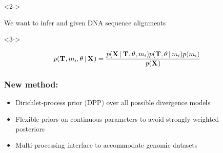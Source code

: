 \begin{frame}[t]
    \vspace{3.5mm}

    \begin{minipage}[c][0.35\textheight][c]{\linewidth}
        \begin{uncoverenv}<2->
            \begin{center}
            We want to infer \textcolor{blue}{\divModel{}} and
            \textcolor{blue}{\divTimeMapVector} given DNA sequence
            alignments
            \textcolor{blue}{\alignmentVector}
        \end{center}
        \end{uncoverenv}

        \vspace{4mm}

        \begin{uncoverenv}<3->
            \begin{displaybox}[0.85\linewidth]
                \begin{minipage}[c][0.12\textheight][c]{\linewidth}

                \[
                    p(\divTimeMapVector,
                      \divModel{i},
                      \allParameters{}
                      \given \alignmentVector)
                      =
                    \frac{
                        p(\alignmentVector \given
                          \divTimeMapVector,
                          \allParameters{},
                          \divModel{i})
                        p(\divTimeMapVector,
                          \allParameters{}
                          \given \divModel{i})
                        p(\divModel{i})
                        }{p(\alignmentVector)}
                \]
                \vspace{-1mm}
                \end{minipage}
            \end{displaybox}
        \end{uncoverenv}
    \end{minipage}
\end{frame}

\begin{frame}
    \frametitle{New method: \dppmsbayes}
    \begin{itemize}
        \item<1-> Dirichlet-process prior (DPP) over all possible divergence
            models
        \item<2-> Flexible priors on continuous parameters to avoid strongly
            weighted posteriors
        \item<3-> Multi-processing interface to accommodate genomic datasets
    \end{itemize}
\end{frame}

